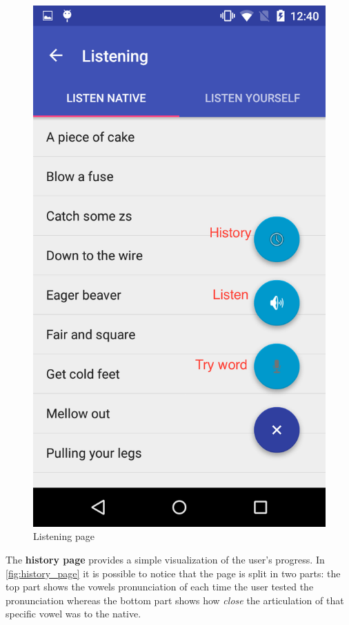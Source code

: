 \begin{figure}[!ht]
\begin{minipage}{.5\textwidth}
		\includegraphics[scale=0.18]{Figures/screenshots/listening.png}
		\caption{Listening page}
		\label{fig:listening_page}
	\end{minipage}
\end{figure}

\noindent The \textbf{history page} provides a simple visualization of the user's progress. In \ref{fig:history_page} it is possible to notice that the page is split in two parts: the top part shows the vowels pronunciation of each time the user tested the pronunciation whereas the bottom part shows how \textit{close} the articulation of that specific vowel was to the native. \\

